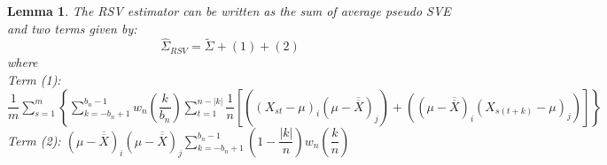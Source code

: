 \documentclass[12pt]{article}
\newtheorem{lemma}{Lemma}
\begin{document}
\bigskip

\begin{lemma} \label{lemma:rsv_breakdown}
    The RSV estimator can be written as the sum of average pseudo SVE and two terms given by:
    \[
    \hat{\Sigma}_{RSV} = \tilde{\Sigma} + (1) + (2)
    \]
    where \\
    Term (1): $\dfrac{1}{m}\sum\limits_{s=1}^{m}\left\{\sum\limits_{k=-b_n+1}^{b_n-1}w_n\left(\dfrac{k}{b_n}\right)\sum\limits_{t=1}^{n-|k|}\dfrac{1}{n}\left[\left((X_{st}-\mu)_i(\mu-\overline{\overline{X}})_j\right)+ \left((\mu-\overline{\overline{X}})_i(X_{s(t+k)}-\mu)_j\right) \right]\right\}$\\
Term (2): $(\mu-\overline{\overline{X}})_i(\mu-\overline{\overline{X}})_j\sum\limits_{k=-b_n+1}^{b_n-1}\left(1-\dfrac{|k|}{n}\right)w_n\left(\dfrac{k}{n}\right)$
\end{lemma}
\end{document}
